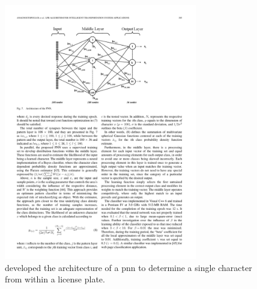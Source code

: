 \begin{figure}[h]
  \centering
  \includegraphics[width=0.75\textwidth]{images/background/anagnostopoulos2006_nn}
  \caption[A PNN used to recognise license plate characters]{\citet{Anagnostopoulos:2006wv} developed the architecture of a \gls{pnn} to determine a single character from within a license plate.}
  \label{fig:background:recognition:anagnostopoulos2006_nn}
\end{figure}

